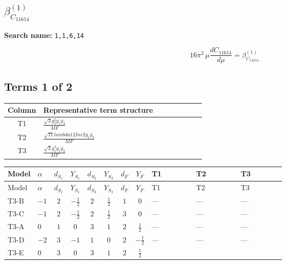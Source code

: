 \documentclass[8pt]{article}
\begin{document}
\begin{landscape}
\section*{$\beta_{C_{11614}}^{(1)}$}
\noindent\textbf{Search name: }\texttt{1,1,6,14}\par\smallskip
\[16\pi^2\,\mu\frac{d C_{11614}}{d\mu}=\beta_{C_{11614}}^{(1)}\]
\subsection*{Terms 1 of 2}
\begin{center}
\begin{tabular}{@{}c >{\raggedright\arraybackslash}p{0.82\linewidth}@{}}
\toprule
Column & Representative term structure \\
\midrule
T1 & \(\displaystyle \frac{\sqrt{3} g_{2}^{2} \overline{y_{1}} \overline{y_{2}}}{MF}\) \\
\midrule
T2 & \(\displaystyle \frac{\sqrt{11} lambda12Inv2 \overline{y_{1}} \overline{y_{2}}}{MF}\) \\
\midrule
T3 & \(\displaystyle \frac{\sqrt{3} g_{1}^{2} \overline{y_{1}} \overline{y_{2}}}{MF}\) \\
\midrule
\bottomrule
\end{tabular}
\end{center}
\smallskip
\tiny
\begin{longtable}{@{}llcccccc >{\raggedright\arraybackslash}p{0.21\linewidth} >{\raggedright\arraybackslash}p{0.21\linewidth} >{\raggedright\arraybackslash}p{0.21\linewidth}@{}}
\toprule
Model & $\alpha$ & $d_{S_1}$ & $Y_{S_1}$ & $d_{S_2}$ & $Y_{S_2}$ & $d_F$ & $Y_F$ & T1 & T2 & T3 \\
\midrule
\endfirsthead
\toprule
Model & $\alpha$ & $d_{S_1}$ & $Y_{S_1}$ & $d_{S_2}$ & $Y_{S_2}$ & $d_F$ & $Y_F$ & T1 & T2 & T3 \\
\midrule
\endhead
T3-B & $-1$ & $2$ & $-\frac{1}{2}$ & $2$ & $\frac{1}{2}$ & $1$ & $0$ & --- & --- & --- \\
\midrule
T3-C & $-1$ & $2$ & $-\frac{1}{2}$ & $2$ & $\frac{1}{2}$ & $3$ & $0$ & --- & --- & --- \\
\midrule
T3-A & $0$ & $1$ & $0$ & $3$ & $1$ & $2$ & $\frac{1}{2}$ & --- & --- & --- \\
\midrule
T3-D & $-2$ & $3$ & $-1$ & $1$ & $0$ & $2$ & $-\frac{1}{2}$ & --- & --- & --- \\
\midrule
T3-E & $0$ & $3$ & $0$ & $3$ & $1$ & $2$ & $\frac{1}{2}$ & \scriptsize\adjustbox{max width=\linewidth}{$\begin{gathered} - \frac{11 \sqrt{3} g_{2}^{2} \overline{y_{1}} \overline{y_{2}}}{8 MF}\end{gathered}$} & \scriptsize\adjustbox{max width=\linewidth}{$\begin{gathered} - \frac{3 \sqrt{11} lambda12Inv2 \overline{y_{1}} \overline{y_{2}}}{22 MF}\end{gathered}$} & \scriptsize\adjustbox{max width=\linewidth}{$\begin{gathered} - \frac{\sqrt{3} g_{1}^{2} \overline{y_{1}} \overline{y_{2}}}{8 MF}\end{gathered}$} \\

\end{longtable}
\end{landscape}
\end{document}
